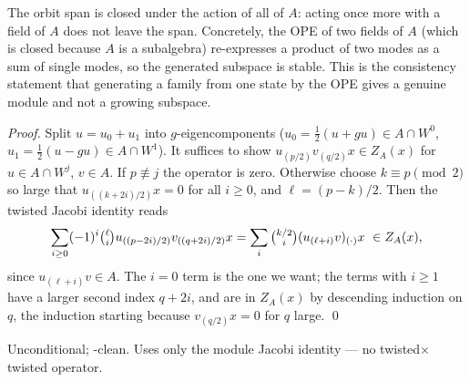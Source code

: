 \begin{physics}
The orbit span is closed under the action of all of $A$: acting once more with a field of $A$ does not leave the span. Concretely, the OPE of two fields of $A$ (which is closed because $A$ is a subalgebra) re-expresses a product of two modes as a sum of single modes, so the generated subspace is stable. This is the consistency statement that generating a family from one state by the OPE gives a genuine module and not a growing subspace.
\end{physics}
\emph{Proof.}  Split $u=u_0+u_1$ into $g$-eigencomponents ($u_0=\tfrac12(u+gu)\in A\cap W^0$,
$u_1=\tfrac12(u-gu)\in A\cap W^1$).  It suffices to show $u_{(p/2)}v_{(q/2)}x\in Z_A(x)$ for $u\in
A\cap W^j$, $v\in A$.  If $p\not\equiv j$ the operator is zero.  Otherwise choose $k\equiv p\pmod 2$
so large that $u_{((k+2i)/2)}x=0$ for all $i\ge0$, and $\ell=(p-k)/2$.  Then the twisted Jacobi
identity reads
\begin{equation*}
  \sum_{i\ge0}(-1)^i\tbinom{\ell}{i}u_{((p-2i)/2)}v_{((q+2i)/2)}x
  =\sum_i\tbinom{k/2}{i}(u_{(\ell+i)}v)_{(\cdot)}x\ \in Z_A(x),
\end{equation*}
since $u_{(\ell+i)}v\in A$.  The $i=0$ term is the one we want; the terms with $i\ge1$ have a larger
second index $q+2i$, and are in $Z_A(x)$ by descending induction on $q$, the induction starting
because $v_{(q/2)}x=0$ for $q$ large. \qed
\begin{status}Unconditional; -clean.  Uses only the module
Jacobi identity --- no twisted$\times$twisted operator.\end{status}


